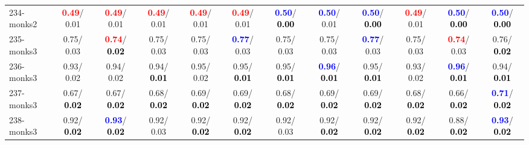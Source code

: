 \begin{table}[h]
\begin{center}
{\begin{tabular}{lc|c|c|c|c|c|c|c|c|c|c}
234-monks2 & \textcolor{red}{\textbf{  0.49}}/  0.01 & \textcolor{red}{\textbf{  0.49}}/  0.01 & \textcolor{red}{\textbf{  0.49}}/  0.01 & \textcolor{red}{\textbf{  0.49}}/  0.01 & \textcolor{red}{\textbf{  0.49}}/  0.01 & \textcolor{blue}{\textbf{  0.50}}/\textcolor{black}{\textbf{  0.00}} & \textcolor{blue}{\textbf{  0.50}}/  0.01 & \textcolor{blue}{\textbf{  0.50}}/\textcolor{black}{\textbf{  0.00}} & \textcolor{red}{\textbf{  0.49}}/  0.01 & \textcolor{blue}{\textbf{  0.50}}/\textcolor{black}{\textbf{  0.00}} & \textcolor{blue}{\textbf{  0.50}}/\textcolor{black}{\textbf{  0.00}} \\
235-monks3 &   0.75/  0.03 & \textcolor{red}{\textbf{  0.74}}/\textcolor{black}{\textbf{  0.02}} &   0.75/  0.03 &   0.75/  0.03 & \textcolor{blue}{\textbf{  0.77}}/  0.03 &   0.75/  0.03 &   0.75/  0.03 & \textcolor{blue}{\textbf{  0.77}}/  0.03 &   0.75/  0.03 & \textcolor{red}{\textbf{  0.74}}/  0.03 &   0.76/\textcolor{black}{\textbf{  0.02}} \\
236-monks3 &   0.93/  0.02 &   0.94/  0.02 &   0.94/\textcolor{black}{\textbf{  0.01}} &   0.95/  0.02 &   0.95/\textcolor{black}{\textbf{  0.01}} &   0.95/\textcolor{black}{\textbf{  0.01}} & \textcolor{blue}{\textbf{  0.96}}/\textcolor{black}{\textbf{  0.01}} &   0.95/\textcolor{black}{\textbf{  0.01}} &   0.93/  0.02 & \textcolor{blue}{\textbf{  0.96}}/\textcolor{black}{\textbf{  0.01}} &   0.94/\textcolor{black}{\textbf{  0.01}} \\
237-monks3 &   0.67/\textcolor{black}{\textbf{  0.02}} &   0.67/\textcolor{black}{\textbf{  0.02}} &   0.68/\textcolor{black}{\textbf{  0.02}} &   0.69/\textcolor{black}{\textbf{  0.02}} &   0.69/\textcolor{black}{\textbf{  0.02}} &   0.68/\textcolor{black}{\textbf{  0.02}} &   0.69/\textcolor{black}{\textbf{  0.02}} &   0.69/\textcolor{black}{\textbf{  0.02}} &   0.68/\textcolor{black}{\textbf{  0.02}} &   0.66/\textcolor{black}{\textbf{  0.02}} & \textcolor{blue}{\textbf{  0.71}}/\textcolor{black}{\textbf{  0.02}} \\
238-monks3 &   0.92/\textcolor{black}{\textbf{  0.02}} & \textcolor{blue}{\textbf{  0.93}}/\textcolor{black}{\textbf{  0.02}} &   0.92/  0.03 &   0.92/\textcolor{black}{\textbf{  0.02}} &   0.92/\textcolor{black}{\textbf{  0.02}} &   0.92/  0.03 &   0.92/\textcolor{black}{\textbf{  0.02}} &   0.92/\textcolor{black}{\textbf{  0.02}} &   0.92/\textcolor{black}{\textbf{  0.02}} &   0.88/\textcolor{black}{\textbf{  0.02}} & \textcolor{blue}{\textbf{  0.93}}/\textcolor{black}{\textbf{  0.02}} \\ \hline

\end{tabular}}
\end{center}
\end{table}
